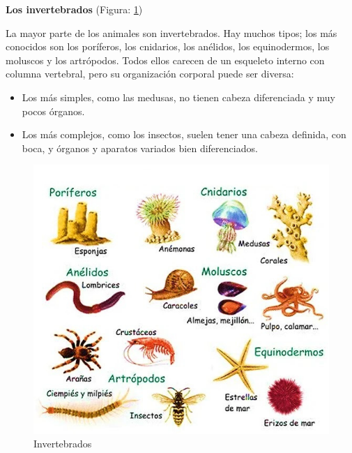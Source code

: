 \vspace{3mm}
\textbf{Los invertebrados} (Figura: \ref{fig:invertebrados})

\vspace{3mm}
La mayor parte de los animales son invertebrados. Hay muchos tipos; los más conocidos son los poríferos, los cnidarios, los anélidos, los equinodermos, los moluscos y los artrópodos. Todos ellos carecen de un esqueleto interno con columna vertebral, pero su organización corporal puede ser diversa:
\begin{itemize}
    \item Los más simples, como las medusas, no tienen cabeza diferenciada y muy pocos órganos.
    \item Los más complejos, como los insectos, suelen tener una cabeza definida, con boca, y órganos y aparatos variados bien diferenciados.
\end{itemize}

\begin{figure}[!ht]
    \centering
    \includegraphics[width=0.7\linewidth]{Tema1/18_Invertebrados.jpg}
    \caption{Invertebrados}
    \label{fig:invertebrados}
\end{figure}

